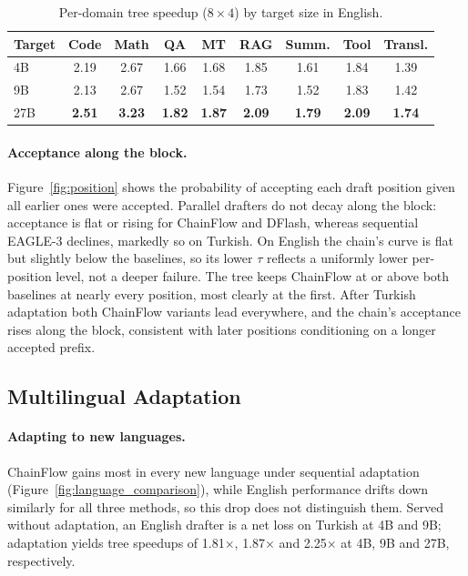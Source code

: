 \documentclass{article}
\newcommand{\Sys}{ChainFlow\xspace}
\begin{document}
\begin{table}[!htbp]
\centering\small
\setlength{\tabcolsep}{2.5pt}
\caption{Per-domain tree speedup ($8\times4$) by target size in English.}
\label{tab:domains}
\vskip 0.1in
\begin{tabular}{lcccccccc}
\toprule
Target & Code & Math & QA & MT & RAG & Summ. & Tool & Transl. \\
\midrule
4B  & 2.19 & 2.67 & 1.66 & 1.68 & 1.85 & 1.61 & 1.84 & 1.39 \\
9B  & 2.13 & 2.67 & 1.52 & 1.54 & 1.73 & 1.52 & 1.83 & 1.42 \\
27B & \textbf{2.51} & \textbf{3.23} & \textbf{1.82} & \textbf{1.87} & \textbf{2.09} & \textbf{1.79} & \textbf{2.09} & \textbf{1.74} \\
\bottomrule
\end{tabular}
\end{table}



\paragraph{Acceptance along the block.}
Figure~\ref{fig:position} shows the probability of accepting each draft
position given all earlier ones were accepted. Parallel drafters do not decay
along the block: acceptance is flat or rising for \Sys and DFlash, whereas
sequential EAGLE-3 declines, markedly so on Turkish. On English the chain's
curve is flat but slightly below the baselines, so its lower $\tau$ reflects a
uniformly lower per-position level, not a deeper failure. The tree keeps \Sys
at or above both baselines at nearly every position, most clearly at the first.
After Turkish adaptation both \Sys variants lead everywhere, and the chain's
acceptance rises along the block, consistent with later positions conditioning
on a longer accepted prefix.

\subsection{Multilingual Adaptation}
\label{sec:multilingual}

\paragraph{Adapting to new languages.}
\Sys gains most in every new language under sequential adaptation (Figure~\ref{fig:language_comparison}),
while English performance drifts down similarly for all three methods,
so this drop does not distinguish them. Served without adaptation, an
English drafter is a net loss on Turkish at 4B and 9B; adaptation yields
tree speedups of 1.81$\times$, 1.87$\times$ and 2.25$\times$ at 4B, 9B and 27B,
respectively.
\end{document}

